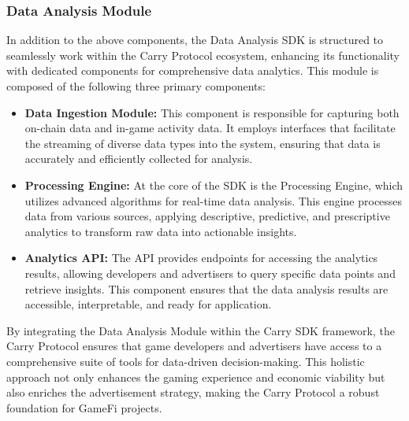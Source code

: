 \subsubsection{Data Analysis Module}
In addition to the above components, the Data Analysis SDK is structured to seamlessly work within the Carry Protocol ecosystem, enhancing its functionality with dedicated components for comprehensive data analytics. This module is composed of the following three primary components: 
\begin{itemize}
 \item \textbf{Data Ingestion Module:} This component is responsible for capturing both on-chain data and in-game activity data. It employs interfaces that facilitate the streaming of diverse data types into the system, ensuring that data is accurately and efficiently collected for analysis.

 \item \textbf{Processing Engine:} At the core of the SDK is the Processing Engine, which utilizes advanced algorithms for real-time data analysis. This engine processes data from various sources, applying descriptive, predictive, and prescriptive analytics to transform raw data into actionable insights.

 \item \textbf{Analytics API:} The API provides endpoints for accessing the analytics results, allowing developers and advertisers to query specific data points and retrieve insights. This component ensures that the data analysis results are accessible, interpretable, and ready for application.
\end{itemize}


By integrating the Data Analysis Module within the Carry SDK framework, the Carry Protocol ensures that game developers and advertisers have access to a comprehensive suite of tools for data-driven decision-making. This holistic approach not only enhances the gaming experience and economic viability but also enriches the advertisement strategy, making the Carry Protocol a robust foundation for GameFi projects.

